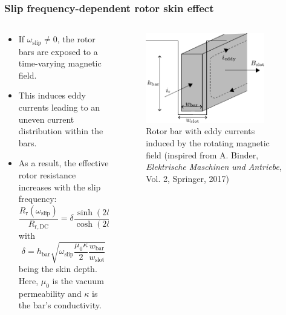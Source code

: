 \begin{frame}
	\frametitle{Slip frequency-dependent rotor skin effect}
    \begin{columns}
		\begin{column}{0.55\textwidth}
	      \begin{itemize}
            \item<1-> If $\omega_\mathrm{slip} \neq 0$, the rotor bars are exposed to a time-varying magnetic field.
            \item<2-> This induces eddy currents leading to an uneven current distribution within the bars.
            \item<3-> As a result, the effective rotor resistance increases with the slip frequency: \begin{equation}
                \frac{R_\mathrm{r}(\omega_\mathrm{slip})}{R_\mathrm{r,DC}} =  \delta \frac{\sinh(2 \delta) + \sin(2 \delta)}{\cosh(2\delta)-\cos(2 \delta)}
              \end{equation}
              with $$\delta = h_\mathrm{bar}\sqrt{\omega_\mathrm{slip} \frac{\mu_0 \kappa}{2}\frac{w_\mathrm{bar}}{w_\mathrm{slot}}}$$ being the skin depth. Here, $\mu_0$ is the vacuum permeability and $\kappa$ is the bar's conductivity.
          \end{itemize}
        \end{column}
        \begin{column}{0.45\textwidth}
            \begin{figure}
                \centering
                \includegraphics[width=0.85\textwidth]{fig/lec06/Eddy_currents_rotor_bar.pdf}
                \caption{Rotor bar with eddy currents induced by the rotating magnetic field (inspired from A. Binder, \textit{Elektrische Maschinen und Antriebe}, Vol. 2, Springer, 2017)}
                \label{fig:Eddy_currents_rotor_bar}
            \end{figure}
        \end{column}
    \end{columns}
\end{frame}

